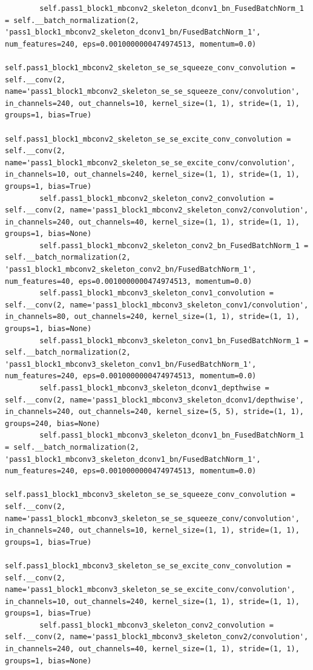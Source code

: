 \documentclass{fisatprojectfinal}
\begin{document}
\begin{appendices}
\begin{lstlisting}
        self.pass1_block1_mbconv2_skeleton_dconv1_bn_FusedBatchNorm_1 = self.__batch_normalization(2, 'pass1_block1_mbconv2_skeleton_dconv1_bn/FusedBatchNorm_1', num_features=240, eps=0.0010000000474974513, momentum=0.0)
        self.pass1_block1_mbconv2_skeleton_se_se_squeeze_conv_convolution = self.__conv(2, name='pass1_block1_mbconv2_skeleton_se_se_squeeze_conv/convolution', in_channels=240, out_channels=10, kernel_size=(1, 1), stride=(1, 1), groups=1, bias=True)
        self.pass1_block1_mbconv2_skeleton_se_se_excite_conv_convolution = self.__conv(2, name='pass1_block1_mbconv2_skeleton_se_se_excite_conv/convolution', in_channels=10, out_channels=240, kernel_size=(1, 1), stride=(1, 1), groups=1, bias=True)
        self.pass1_block1_mbconv2_skeleton_conv2_convolution = self.__conv(2, name='pass1_block1_mbconv2_skeleton_conv2/convolution', in_channels=240, out_channels=40, kernel_size=(1, 1), stride=(1, 1), groups=1, bias=None)
        self.pass1_block1_mbconv2_skeleton_conv2_bn_FusedBatchNorm_1 = self.__batch_normalization(2, 'pass1_block1_mbconv2_skeleton_conv2_bn/FusedBatchNorm_1', num_features=40, eps=0.0010000000474974513, momentum=0.0)
        self.pass1_block1_mbconv3_skeleton_conv1_convolution = self.__conv(2, name='pass1_block1_mbconv3_skeleton_conv1/convolution', in_channels=80, out_channels=240, kernel_size=(1, 1), stride=(1, 1), groups=1, bias=None)
        self.pass1_block1_mbconv3_skeleton_conv1_bn_FusedBatchNorm_1 = self.__batch_normalization(2, 'pass1_block1_mbconv3_skeleton_conv1_bn/FusedBatchNorm_1', num_features=240, eps=0.0010000000474974513, momentum=0.0)
        self.pass1_block1_mbconv3_skeleton_dconv1_depthwise = self.__conv(2, name='pass1_block1_mbconv3_skeleton_dconv1/depthwise', in_channels=240, out_channels=240, kernel_size=(5, 5), stride=(1, 1), groups=240, bias=None)
        self.pass1_block1_mbconv3_skeleton_dconv1_bn_FusedBatchNorm_1 = self.__batch_normalization(2, 'pass1_block1_mbconv3_skeleton_dconv1_bn/FusedBatchNorm_1', num_features=240, eps=0.0010000000474974513, momentum=0.0)
        self.pass1_block1_mbconv3_skeleton_se_se_squeeze_conv_convolution = self.__conv(2, name='pass1_block1_mbconv3_skeleton_se_se_squeeze_conv/convolution', in_channels=240, out_channels=10, kernel_size=(1, 1), stride=(1, 1), groups=1, bias=True)
        self.pass1_block1_mbconv3_skeleton_se_se_excite_conv_convolution = self.__conv(2, name='pass1_block1_mbconv3_skeleton_se_se_excite_conv/convolution', in_channels=10, out_channels=240, kernel_size=(1, 1), stride=(1, 1), groups=1, bias=True)
        self.pass1_block1_mbconv3_skeleton_conv2_convolution = self.__conv(2, name='pass1_block1_mbconv3_skeleton_conv2/convolution', in_channels=240, out_channels=40, kernel_size=(1, 1), stride=(1, 1), groups=1, bias=None)

\end{lstlisting}
\end{appendices}
\end{document}
